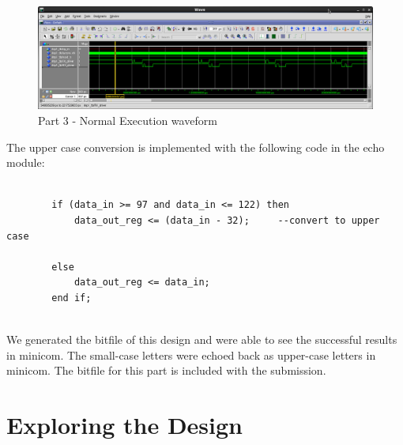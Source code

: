 \documentclass{article}
\begin{document}
	\begin{figure}[h]
		\begin{center}
			\includegraphics[scale=0.35]{../part3_files/MP1-Normal_Execution.png}
			\caption{Part 3 - Normal Execution waveform}
		\end{center}
	\end{figure}

The upper case conversion is implemented with the following code in the echo module:

\begin{center}

	\begin{lstlisting}[style=vhdl]
	
		if (data_in >= 97 and data_in <= 122) then
			data_out_reg <= (data_in - 32);		--convert to upper case
			
		else
			data_out_reg <= data_in;
		end if;
	
	\end{lstlisting}

\end{center}

We generated the bitfile of this design and were able to see the successful results in minicom. The small-case letters were echoed back as upper-case letters in minicom. The bitfile for this part is included with the submission.


\section{Exploring the Design}
\end{document}
